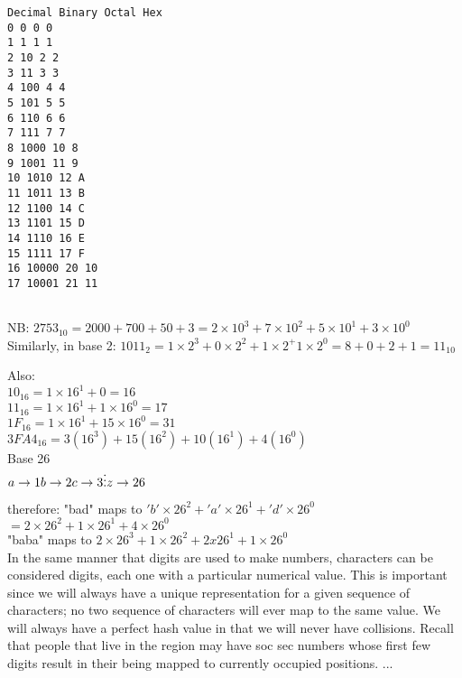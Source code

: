 \documentclass[12pt]{article} %
\begin{document}
\begin{verbatim}
Decimal Binary Octal Hex 
0 0 0 0 
1 1 1 1 
2 10 2 2 
3 11 3 3 
4 100 4 4 
5 101 5 5 
6 110 6 6 
7 111 7 7 
8 1000 10 8 
9 1001 11 9 
10 1010 12 A 
11 1011 13 B 
12 1100 14 C 
13 1101 15 D 
14 1110 16 E 
15 1111 17 F 
16 10000 20 10 
17 10001 21 11  


\end{verbatim}




NB:    $2753_{10}   =  2000 + 700 + 50 + 3  = 
2 \times 10^3 + 7 \times 10^2 + 5 \times 10^1 + 3 \times 10^0 $ \\


Similarly, in base 2:   $1011_2 = 1 \times 2^3  +  0 \times 2^2  + 1\times2^ +1\times2^0  = 8 + 0 + 2 + 1 = 11_{10}$

Also:
\\
$10_{16}  = 1 \times 16^1 + 0 = 16$ \\
$11_{16} = 1 \times 16^1 + 1\times16^0 = 17$ \\
$1F_{16} = 1 \times 16^1 + 15\times16^0 = 31$ \\
$3FA4_{16} = 3(16^3) + 15(16^2) + 10(16^1) + 4(16^0)$  \\

Base 26  \\
\begin{math}
a \rightarrow 1 \\
b \rightarrow 2 \\
c \rightarrow 3 \\
\vdots  \\
z \rightarrow 26 \\
\end{math}

therefore:   "bad"  maps to $'b' \times 26^2 + 'a' \times 26^1 + 'd' \times 26^0$  \\

                                  $ = 2 \times 26^2 + 1 \times 26^1 + 4 \times 26^0$  \\



"baba" maps to   $2 \times 26^3 + 1 \times 26^2 + 2 x 26^1 + 1 \times 26^0 $  \\





In the same manner that digits are used to make numbers, characters can be considered digits, each one with a particular numerical value.  This is important since we will always have a unique representation for a given sequence of characters; no two sequence of characters will ever map to the same value.  We will always have a perfect hash value in that we will never have collisions.  Recall that people that live in the region may have soc sec numbers whose first few digits result in their being mapped to currently occupied positions. ...
\end{document}
